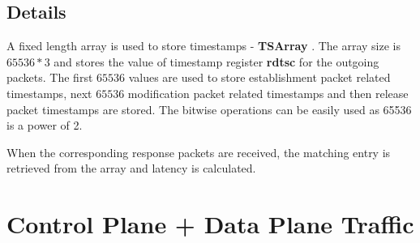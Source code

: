 \subsection{Details}
A fixed length array is used to store timestamps - \textbf{TSArray} . The
array size is $65536 * 3$ and stores the value of timestamp register \textbf{rdtsc} for the
outgoing packets. The first $65536$ values are used to store establishment packet related
timestamps, next $65536$ modification packet related timestamps and then release packet
timestamps are stored.  The bitwise operations can be easily used as 65536 is a power of 2.

When the corresponding response packets are received, the matching entry is retrieved from the array and latency is calculated. 

\section{Control Plane + Data Plane Traffic}